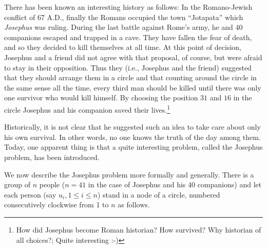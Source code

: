 \documentclass{article}
\begin{document}
There has been known an interesting history   as follows:
In the Romano-Jewish conflict of   67 A.D., finally the Romans occupied the town ``Jotapata'' which \textit{Josephus} was ruling.
During the last battle against Rome's army,  he and   $40$ companions escaped and trapped in a cave. 
They have fallen the fear of death, and so they decided to kill themselves at  all time.
At this point of decision,   Josephus and a friend did not agree with that proposal, of course,
  but were afraid to stay in their opposition.
Thus they (i.e., Josephus and the friend) suggested that they should arrange them in a circle and that counting around the circle  
in the same sense all the time,   every third man should be killed until there was only one survivor who would kill himself.  
By choosing the position $31$   and $16$   in the circle Josephus
and his companion saved their lives.\footnote{How did Josephus become  Roman historian? How survived? Why historian of all choices?; Quite interesting :-)}


Historically, it is not clear that he suggested such an idea to take care about only his own survival.
In other words, no one knows the truth of the day among them.
Today, one apparent thing is  that a quite interesting problem, called the Josephus problem, has been introduced.


We now describe  the Josephus problem  more formally and generally. 
There is a group of $n$ people ($n=41$ in the case of Josephus and his 40 companions) and 
let each person  (say $u_i,1\leq i\leq n$) stand in a node of a circle, numbered consecutively clockwise from 1 to $n$ as follows. 
\end{document}
